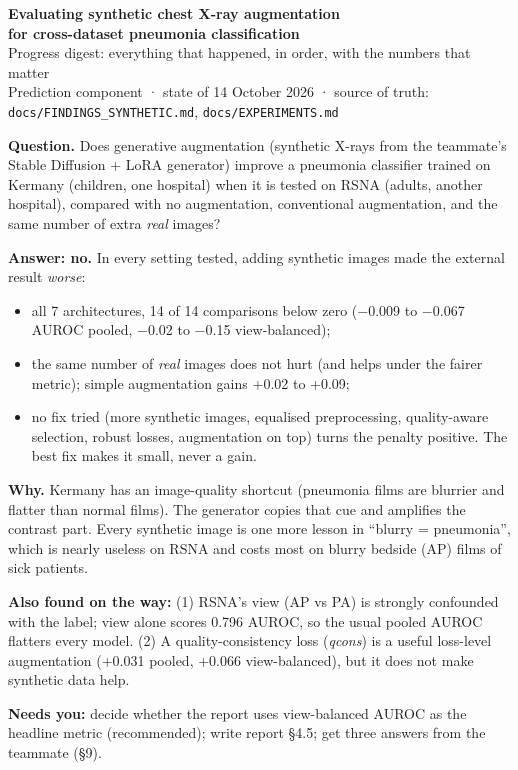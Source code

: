 \documentclass[10pt,a4paper]{article}
\newcommand{\down}[1]{\textcolor{bad}{#1}}
\newcommand{\up}[1]{\textcolor{good}{#1}}
\begin{document}
\begin{center}
{\sffamily\LARGE\bfseries\color{accent} Evaluating synthetic chest X-ray augmentation\\[2pt] for cross-dataset pneumonia classification}\\[6pt]
{\sffamily\large Progress digest: everything that happened, in order, with the numbers that matter}\\[3pt]
{\small Prediction component · state of 14 October 2026 · source of truth: \texttt{docs/FINDINGS_SYNTHETIC.md}, \texttt{docs/EXPERIMENTS.md}}
\end{center}

\begin{keybox}
\textbf{Question.} Does generative augmentation (synthetic X-rays from the teammate's Stable Diffusion + LoRA generator) improve a
pneumonia classifier trained on Kermany (children, one hospital) when it is tested on RSNA (adults, another hospital), compared with
no augmentation, conventional augmentation, and the same number of extra \emph{real} images?

\textbf{Answer: no.} In every setting tested, adding synthetic images made the external result \emph{worse}:
\begin{itemize}
\item all 7 architectures, \down{14 of 14} comparisons below zero (\down{$-$0.009 to $-$0.067} AUROC pooled, \down{$-$0.02 to $-$0.15} view-balanced);
\item the same number of \emph{real} images does not hurt (and helps under the fairer metric); simple augmentation gains \up{+0.02 to +0.09};
\item no fix tried (more synthetic images, equalised preprocessing, quality-aware selection, robust losses, augmentation on top)
turns the penalty positive. The best fix makes it small, never a gain.
\end{itemize}
\textbf{Why.} Kermany has an image-quality shortcut (pneumonia films are blurrier and flatter than normal films). The generator
copies that cue and amplifies the contrast part. Every synthetic image is one more lesson in ``blurry = pneumonia'', which is
nearly useless on RSNA and costs most on blurry bedside (AP) films of sick patients.

\textbf{Also found on the way:} (1) RSNA's view (AP vs PA) is strongly confounded with the label; view alone scores 0.796
AUROC, so the usual pooled AUROC flatters every model. (2) A quality-consistency loss (\emph{qcons}) is a useful loss-level
augmentation (+0.031 pooled, +0.066 view-balanced), but it does not make synthetic data help.

\textbf{Needs you:} decide whether the report uses view-balanced AUROC as the headline metric (recommended); write report §4.5;
get three answers from the teammate (§9).
\end{keybox}
\end{document}
